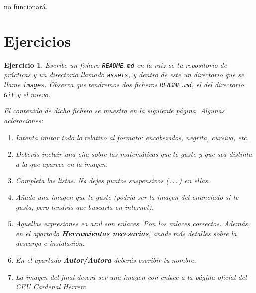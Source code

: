 \documentclass[11pt,a4paper]{article}
\theoremstyle{exercise}
\newtheorem{exercise}{Ejercicio}
\begin{document}
\medskip

\noindent no funcionará.




\newpage
\section{Ejercicios}


\begin{exercise} Escribe un fichero \texttt{README.md} en la raíz de tu repositorio de prácticas y un directorio llamado \texttt{assets}, y dentro de este un directorio que se llame \texttt{images}. Observa que tendremos dos ficheros \texttt{README.md}, el del directorio \texttt{Git} y el nuevo.

\begin{center}
\begin{minipage}{0.75\linewidth}
\end{minipage}
\end{center}

\bigskip

\noindent El contenido de dicho fichero se muestra en la siguiente página. Algunas aclaraciones:
\begin{enumerate}
	\item Intenta imitar todo lo relativo al formato: encabezados, negrita, cursiva, etc.
	\item Deberás incluir una cita sobre las matemáticas que te guste y que sea distinta a la que aparece en la imagen.
	\item Completa las listas. No dejes puntos suspensivos (\texttt{...}) en ellas. 
	\item Añade una imagen que te guste (podría ser la imagen del enunciado si te gusta, pero tendrás que buscarla en internet).
	\item Aquellas expresiones en azul son enlaces. Pon los enlaces correctos. Además, en el apartado \textbf{Herramientas necesarias}, añade más detalles sobre la descarga e instalación.
	\item En el apartado \textbf{Autor/Autora} deberás escribir tu nombre.
	\item La imagen del final deberá ser una imagen con enlace a la página oficial del CEU Cardenal Herrera.
\end{enumerate}


\end{exercise}
\end{document}

